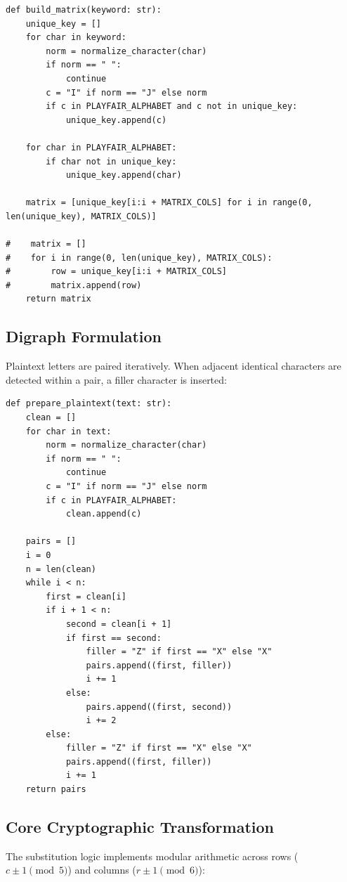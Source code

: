 \documentclass{labreport}
\begin{document}
\begin{lstlisting}[style=python]
def build_matrix(keyword: str):
    unique_key = []
    for char in keyword:
        norm = normalize_character(char)
        if norm == " ":
            continue
        c = "I" if norm == "J" else norm
        if c in PLAYFAIR_ALPHABET and c not in unique_key:
            unique_key.append(c)

    for char in PLAYFAIR_ALPHABET:
        if char not in unique_key:
            unique_key.append(char)

    matrix = [unique_key[i:i + MATRIX_COLS] for i in range(0, len(unique_key), MATRIX_COLS)]

#    matrix = []
#    for i in range(0, len(unique_key), MATRIX_COLS):
#        row = unique_key[i:i + MATRIX_COLS]
#        matrix.append(row)
    return matrix
\end{lstlisting}

\subsection{Digraph Formulation}
Plaintext letters are paired iteratively. When adjacent identical characters are detected within a pair, a filler character is inserted:

\begin{lstlisting}[style=python]
def prepare_plaintext(text: str):
    clean = []
    for char in text:
        norm = normalize_character(char)
        if norm == " ":
            continue
        c = "I" if norm == "J" else norm
        if c in PLAYFAIR_ALPHABET:
            clean.append(c)

    pairs = []
    i = 0
    n = len(clean)
    while i < n:
        first = clean[i]
        if i + 1 < n:
            second = clean[i + 1]
            if first == second:
                filler = "Z" if first == "X" else "X"
                pairs.append((first, filler))
                i += 1
            else:
                pairs.append((first, second))
                i += 2
        else:
            filler = "Z" if first == "X" else "X"
            pairs.append((first, filler))
            i += 1
    return pairs
\end{lstlisting}

\subsection{Core Cryptographic Transformation}
The substitution logic implements modular arithmetic across rows ($c \pm 1 \pmod 5$) and columns ($r \pm 1 \pmod 6$):
\end{document}
